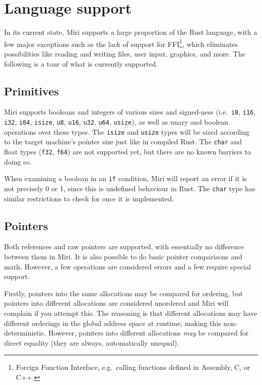 \documentclass[twocolumn]{article}
\newcommand{\rust}[1]{\texttt{#1}}
\begin{document}

\section{Language support}

In its current state, Miri supports a large proportion of the Rust language, with a few major
exceptions such as the lack of support for FFI\footnote{Foreign Function Interface, e.g.\ calling
functions defined in Assembly, C, or C++.}, which eliminates possibilities like reading and writing
files, user input, graphics, and more. The following is a tour of what is currently supported.

\subsection{Primitives}

Miri supports booleans and integers of various sizes and signed-ness (i.e.\ \rust{i8}, \rust{i16},
\rust{i32}, \rust{i64}, \rust{isize}, \rust{u8}, \rust{u16}, \rust{u32}, \rust{u64}, \rust{usize}),
as well as unary and boolean operations over these types. The \rust{isize} and \rust{usize} types
will be sized according to the target machine's pointer size just like in compiled Rust. The
\rust{char} and float types (\rust{f32}, \rust{f64}) are not supported yet, but there are no known
barriers to doing so.

When examining a boolean in an \rust{if} condition, Miri will report an error if it is not precisely
0 or 1, since this is undefined behaviour in Rust. The \rust{char} type has similar restrictions to
check for once it is implemented.

\subsection{Pointers}

Both references and raw pointers are supported, with essentially no difference between them in Miri.
It is also possible to do basic pointer comparisons and math. However, a few operations are
considered errors and a few require special support.

Firstly, pointers into the same allocations may be compared for ordering, but pointers into
different allocations are considered unordered and Miri will complain if you attempt this. The
reasoning is that different allocations may have different orderings in the global address space at
runtime, making this non-deterministic. However, pointers into different allocations \emph{may} be
compared for direct equality (they are always, automatically unequal).
\end{document}
